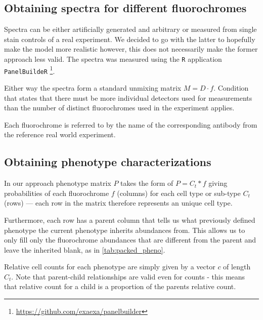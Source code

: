   \subsection{Obtaining spectra for different fluorochromes} 
  Spectra can be either artificially generated and arbitrary or measured from single stain controls of a real experiment.  We decided to go with the latter to hopefully make the model more realistic however, this does not necessarily make the former approach less valid. The spectra was measured using the \texttt{R} application \texttt{PanelBuildeR} \footnote{\url{https://github.com/exaexa/panelbuilder}}.
  
  Either way the spectra form a standard unmixing matrix $M=D \cdot f$. Condition that states that there must be more individual detectors used for measurements than the number of distinct fluorochromes used in the experiment applies.
  
  Each fluorochrome is referred to by the name of the corresponding antibody from the reference real world experiment. 
  
  \subsection{Obtaining phenotype characterizations}
  In our approach phenotype matrix $P$ takes the form of $P=C_t*f$ giving probabilities of each fluorochrome $f$ (columns) for each cell type or sub-type $C_t$ (rows) --- each row in the matrix therefore represents an unique cell type.
  
  Furthermore, each row has a parent column that tells us what previously defined phenotype the current phenotype inherits abundances from. This allows us to only fill only the fluorochrome abundances that are different from the parent and leave the inherited blank, as in \cref{tab:packed_pheno}. 
  
  Relative cell counts for each phenotype are simply given by a vector $c$ of length $C_t$. Note that parent-child relationships are valid even for counts - this means that relative count for a child is a proportion of the parents relative count. 
  




